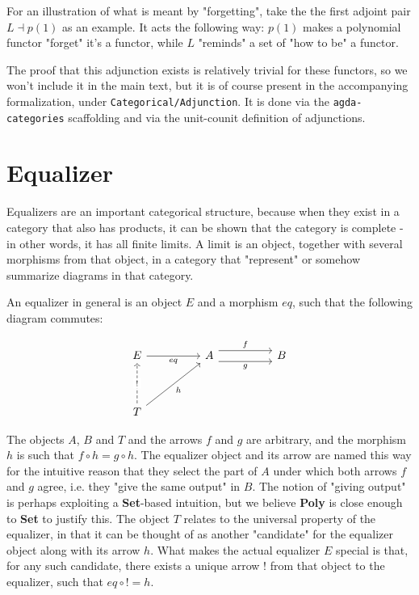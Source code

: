 For an illustration of what is meant by "forgetting", take the the first adjoint pair $L \dashv p(1)$ as an example. It acts the following way: $p(1)$ makes a polynomial functor "forget" it's a functor, while $L$ "reminds" a set of "how to be" a functor.

The proof that this adjunction exists is relatively trivial for these functors, so we won't include it in the main text, but it is of course present in the accompanying formalization, under \texttt{Categorical/Adjunction}. It is done via the \texttt{agda-categories} scaffolding and via the unit-counit definition of adjunctions.

\section{Equalizer}

Equalizers are an important categorical structure, because when they exist in a category that also has products, it can be shown that the category is complete - in other words, it has all finite limits. A limit is an object, together with several morphisms from that object, in a category that "represent" or somehow summarize diagrams in that category.

An equalizer in general is an object $E$ and a morphism $eq$, such that the following diagram commutes:

\[\begin{tikzcd}
	E && A && B \\
	\\
	T
	\arrow["g"', shift right=2, from=1-3, to=1-5]
	\arrow["f", shift left=2, from=1-3, to=1-5]
	\arrow["eq"', from=1-1, to=1-3]
	\arrow["h"', from=3-1, to=1-3]
	\arrow["{!}"{description}, dashed, from=3-1, to=1-1]
\end{tikzcd}\]

The objects $A$, $B$ and $T$ and the arrows $f$ and $g$ are arbitrary, and the morphism $h$ is such that $f \circ h = g \circ h$. The equalizer object and its arrow are named this way for the intuitive reason that they select the part of $A$ under which both arrows $f$ and $g$ agree, i.e. they "give the same output" in $B$. The notion of "giving output" is perhaps exploiting a \textbf{Set}-based intuition, but we believe \textbf{Poly} is close enough to \textbf{Set} to justify this. The object $T$ relates to the universal property of the equalizer, in that it can be thought of as another "candidate" for the equalizer object along with its arrow $h$. What makes the actual equalizer $E$ special is that, for any such candidate, there exists a unique arrow $!$ from that object to the equalizer, such that $eq \circ ! = h$.

